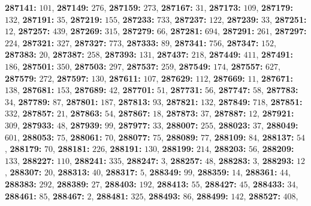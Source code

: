 \textsf{\bfseries 287141:} $101$, \textsf{\bfseries 287149:} $276$, \textsf{\bfseries 287159:} $273$, \textsf{\bfseries 287167:} $31$, \textsf{\bfseries 287173:} $109$, \textsf{\bfseries 287179:} $132$, \textsf{\bfseries 287191:} $35$, \textsf{\bfseries 287219:} $155$, \textsf{\bfseries 287233:} $733$, \textsf{\bfseries 287237:} $122$, \textsf{\bfseries 287239:} $33$, \textsf{\bfseries 287251:} $12$, \textsf{\bfseries 287257:} $439$, \textsf{\bfseries 287269:} $315$, \textsf{\bfseries 287279:} $66$, \textsf{\bfseries 287281:} $694$, \textsf{\bfseries 287291:} $261$, \textsf{\bfseries 287297:} $224$, \textsf{\bfseries 287321:} $327$, \textsf{\bfseries 287327:} $773$, \textsf{\bfseries 287333:} $89$, \textsf{\bfseries 287341:} $756$, \textsf{\bfseries 287347:} $152$, \textsf{\bfseries 287383:} $20$, \textsf{\bfseries 287387:} $258$, \textsf{\bfseries 287393:} $131$, \textsf{\bfseries 287437:} $218$, \textsf{\bfseries 287449:} $411$, \textsf{\bfseries 287491:} $186$, \textsf{\bfseries 287501:} $350$, \textsf{\bfseries 287503:} $297$, \textsf{\bfseries 287537:} $259$, \textsf{\bfseries 287549:} $174$, \textsf{\bfseries 287557:} $627$, \textsf{\bfseries 287579:} $272$, \textsf{\bfseries 287597:} $130$, \textsf{\bfseries 287611:} $107$, \textsf{\bfseries 287629:} $112$, \textsf{\bfseries 287669:} $11$, \textsf{\bfseries 287671:} $138$, \textsf{\bfseries 287681:} $153$, \textsf{\bfseries 287689:} $42$, \textsf{\bfseries 287701:} $51$, \textsf{\bfseries 287731:} $56$, \textsf{\bfseries 287747:} $58$, \textsf{\bfseries 287783:} $34$, \textsf{\bfseries 287789:} $87$, \textsf{\bfseries 287801:} $187$, \textsf{\bfseries 287813:} $93$, \textsf{\bfseries 287821:} $132$, \textsf{\bfseries 287849:} $718$, \textsf{\bfseries 287851:} $332$, \textsf{\bfseries 287857:} $21$, \textsf{\bfseries 287863:} $54$, \textsf{\bfseries 287867:} $18$, \textsf{\bfseries 287873:} $37$, \textsf{\bfseries 287887:} $12$, \textsf{\bfseries 287921:} $309$, \textsf{\bfseries 287933:} $48$, \textsf{\bfseries 287939:} $99$, \textsf{\bfseries 287977:} $33$, \textsf{\bfseries 288007:} $255$, \textsf{\bfseries 288023:} $37$, \textsf{\bfseries 288049:} $601$, \textsf{\bfseries 288053:} $75$, \textsf{\bfseries 288061:} $70$, \textsf{\bfseries 288077:} $75$, \textsf{\bfseries 288089:} $77$, \textsf{\bfseries 288109:} $84$, \textsf{\bfseries 288137:} $54$, \textsf{\bfseries 288179:} $70$, \textsf{\bfseries 288181:} $226$, \textsf{\bfseries 288191:} $130$, \textsf{\bfseries 288199:} $214$, \textsf{\bfseries 288203:} $56$, \textsf{\bfseries 288209:} $133$, \textsf{\bfseries 288227:} $110$, \textsf{\bfseries 288241:} $335$, \textsf{\bfseries 288247:} $3$, \textsf{\bfseries 288257:} $48$, \textsf{\bfseries 288283:} $3$, \textsf{\bfseries 288293:} $12$, \textsf{\bfseries 288307:} $20$, \textsf{\bfseries 288313:} $40$, \textsf{\bfseries 288317:} $5$, \textsf{\bfseries 288349:} $99$, \textsf{\bfseries 288359:} $14$, \textsf{\bfseries 288361:} $44$, \textsf{\bfseries 288383:} $292$, \textsf{\bfseries 288389:} $27$, \textsf{\bfseries 288403:} $192$, \textsf{\bfseries 288413:} $55$, \textsf{\bfseries 288427:} $45$, \textsf{\bfseries 288433:} $34$, \textsf{\bfseries 288461:} $85$, \textsf{\bfseries 288467:} $2$, \textsf{\bfseries 288481:} $325$, \textsf{\bfseries 288493:} $86$, \textsf{\bfseries 288499:} $142$, \textsf{\bfseries 288527:} $408$, 

